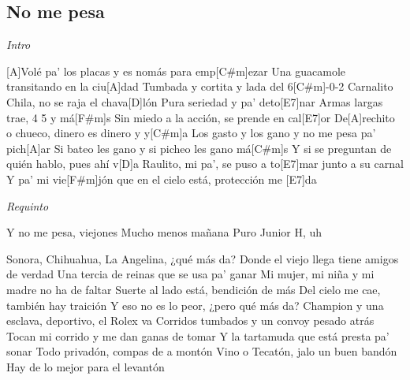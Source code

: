 \subsection{No me pesa}
\noindent

\vspace{1cm}
\begin{guitar}
	\begin{multicols}{2}

		\textit{Intro}
		\par
			
		[A]Volé pa' los placas y es nomás para emp[C#m]ezar
		Una guacamole transitando en la ciu[A]dad
		Tumbada y cortita y lada del 6[C#m]-0-2
		Carnalito Chila, no se raja el chava[D]lón
		Pura seriedad y pa' deto[E7]nar
		Armas largas trae, 4 5 y má[F#m]s
		Sin miedo a la acción, se prende en cal[E7]or
		De[A]rechito o chueco, dinero es dinero y y[C#m]a
		Los gasto y los gano y no me pesa pa' pich[A]ar
		Si bateo les gano y si picheo les gano má[C#m]s
		Y si se preguntan de quién hablo, pues ahí v[D]a
		Raulito, mi pa', se puso a to[E7]mar junto a su carnal
		Y pa' mi vie[F#m]jón que en el cielo está, protección me [E7]da

		\par

		\textit{Requinto}
		\par
		Y no me pesa, viejones
		Mucho menos mañana
		Puro Junior H, uh
		\par
		Sonora, Chihuahua, La Angelina, ¿qué más da?
		Donde el viejo llega tiene amigos de verdad
		Una tercia de reinas que se usa pa' ganar
		Mi mujer, mi niña y mi madre no ha de faltar
		Suerte al lado está, bendición de más
		Del cielo me cae, también hay traición
		Y eso no es lo peor, ¿pero qué más da?
		Champion y una esclava, deportivo, el Rolex va
		Corridos tumbados y un convoy pesado atrás
		Tocan mi corrido y me dan ganas de tomar
		Y la tartamuda que está presta pa' sonar
		Todo privadón, compas de a montón
		Vino o Tecatón, jalo un buen bandón
		Hay de lo mejor para el levantón

	\end{multicols}
\end{guitar}
